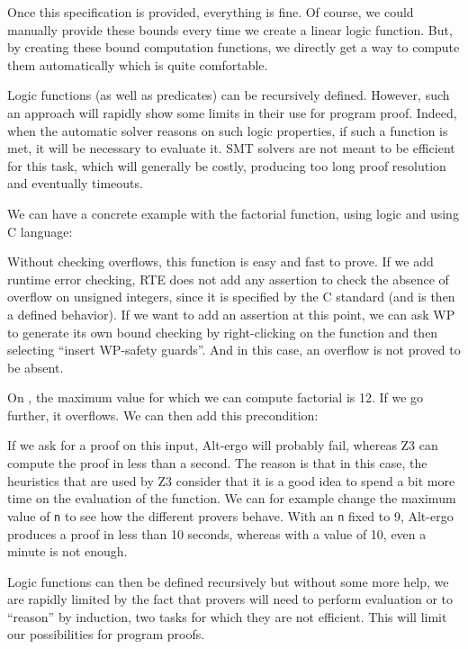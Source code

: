 Once this specification is provided, everything is fine. Of course, we
could manually provide these bounds every time we create a linear logic
function. But, by creating these bound computation functions, we directly
get a way to compute them automatically which is quite comfortable.





Logic functions (as well as predicates) can be recursively defined.
However, such an approach will rapidly show some limits in their use for
program proof. Indeed, when the automatic solver reasons on such logic
properties, if such a function is met, it will be necessary to evaluate it.
SMT solvers are not meant to be efficient for this task, which will generally
be costly, producing too long proof resolution and eventually timeouts.

We can have a concrete example with the factorial function, using logic
and using C language:






Without checking overflows, this function is easy and fast to prove. If
we add runtime error checking, RTE does not add any assertion to check
the absence of overflow on unsigned integers, since it is specified by
the C standard (and is then a defined behavior). If we want to add an
assertion at this point, we can ask WP to generate its own bound
checking by right-clicking on the function and then selecting ``insert
WP-safety guards''. And in this case, an overflow is not proved to be
absent.



On , the maximum value for which we can compute
factorial is 12. If we go further, it overflows. We can then add this
precondition:






If we ask for a proof on this input, Alt-ergo will probably fail,
whereas Z3 can compute the proof in less than a second. The reason is
that in this case, the heuristics that are used by Z3 consider that it
is a good idea to spend a bit more time on the evaluation of the
function. We can for example change the maximum value of \texttt{n} to
see how the different provers behave. With an \texttt{n} fixed to 9,
Alt-ergo produces a proof in less than 10 seconds, whereas with a value
of 10, even a minute is not enough.



Logic functions can then be defined recursively but without some more
help, we are rapidly limited by the fact that provers will need to
perform evaluation or to ``reason'' by induction, two tasks for which
they are not efficient. This will limit our possibilities for program
proofs.

